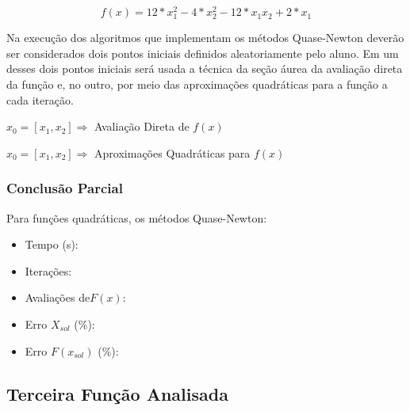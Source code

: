     \begin{equation*} 
        f(x) = 12*x_1^2 - 4*x_2^2 - 12*x_1x_2 + 2*x_1
    \end{equation*}
    
    Na execução dos algoritmos que implementam os métodos Quase-Newton deverão ser considerados dois pontos iniciais definidos aleatoriamente pelo aluno. Em um desses dois pontos iniciais será usada a técnica da seção áurea da avaliação direta da função e, no outro, por meio das aproximações quadráticas para a função a cada iteração. 

        \begin{minipage}{\linewidth}
            \centering
            $x_0=[x_1,x_2]\Longrightarrow$  Avaliação Direta de $f(x)$
            \label{tab:tble} 
            \writetable{\tble}
            \bigskip
        \end{minipage}
        
        \begin{minipage}{\linewidth}
            \centering
            $x_0=[x_1,x_2]\Longrightarrow$  Aproximações Quadráticas para $f(x)$
            \label{tab:tblf} 
            \writetable{\tblf}
            \bigskip
        \end{minipage}

         \subsubsection{Conclusão Parcial}
            Para funções quadráticas, os métodos Quase-Newton:
            \begin{itemize}
            \item {Tempo (s):} 
            \item {Iterações:} 
            \item {Avaliações de$F(x)$:} 
            \item {Erro $X_{sol}$ (\%):} 
            \item {Erro $F(x_{sol})$ (\%):} 
            \end{itemize}        
   
    \subsection{Terceira Função Analisada}

